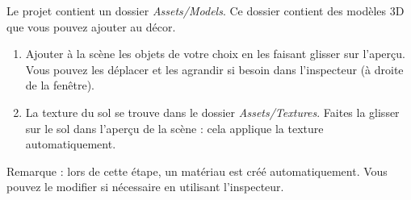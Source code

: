 Le projet contient un dossier \textit{Assets/Models}. Ce dossier contient des modèles 3D que vous pouvez ajouter au décor.
\begin{enumerate}
\item Ajouter à la scène les objets de votre choix en les faisant glisser sur l'aperçu. Vous pouvez les déplacer et les agrandir si besoin dans l'inspecteur (à droite de la fenêtre).
\item La texture du sol se trouve dans le dossier \textit{Assets/Textures}. Faites la glisser sur le sol dans l'aperçu de la scène : cela applique la texture automatiquement.
\end{enumerate}

Remarque : lors de cette étape, un matériau est créé automatiquement. Vous pouvez le modifier si nécessaire en utilisant l'inspecteur.%